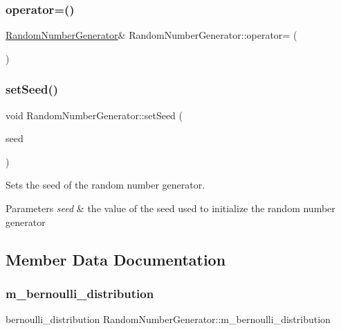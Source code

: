 \subsubsection{\texorpdfstring{operator=()}{operator=()}}
{\footnotesize\ttfamily \hyperlink{class_random_number_generator}{Random\+Number\+Generator}\& Random\+Number\+Generator\+::operator= (\begin{DoxyParamCaption}\item[{const \hyperlink{class_random_number_generator}{Random\+Number\+Generator} \&}]{ }\end{DoxyParamCaption})\hspace{0.3cm}{\ttfamily [private]}}

\mbox{\label{class_random_number_generator_a20e812772b0544720b32256911e372e2}} 
\subsubsection{\texorpdfstring{set\+Seed()}{setSeed()}}
{\footnotesize\ttfamily void Random\+Number\+Generator\+::set\+Seed (\begin{DoxyParamCaption}\item[{unsigned}]{seed }\end{DoxyParamCaption})}

Sets the seed of the random number generator. 
\begin{DoxyParams}{Parameters}
{\em seed} & the value of the seed used to initialize the random number generator \\
\hline
\end{DoxyParams}


\subsection{Member Data Documentation}
\mbox{\label{class_random_number_generator_ae0cd7e84eca4dba3ba65902ffff61e96}} 
\subsubsection{\texorpdfstring{m\+\_\+bernoulli\+\_\+distribution}{m\_bernoulli\_distribution}}
{\footnotesize\ttfamily bernoulli\+\_\+distribution Random\+Number\+Generator\+::m\+\_\+bernoulli\+\_\+distribution\hspace{0.3cm}{\ttfamily [private]}}

